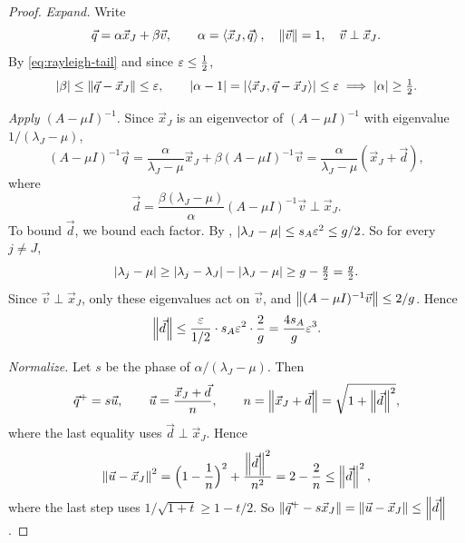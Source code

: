 \begin{proof}
  \emph{Expand.} Write
  \begin{equation*}
    \vec{q} = \alpha\vec{x}_J + \beta\vec{v}, \qquad \alpha = \left\langle \vec{x}_J, \vec{q} \right\rangle, \quad \left\lVert \vec{v} \right\rVert = 1, \quad \vec{v} \perp \vec{x}_J.
  \end{equation*}
  By \eqref{eq:rayleigh-tail} and since $\varepsilon \le \frac{1}{2}$,
  \begin{equation*}
    \left\lvert \beta \right\rvert \le \left\lVert \vec{q} - \vec{x}_J \right\rVert \le \varepsilon, \qquad
    \left\lvert \alpha - 1 \right\rvert = \left\lvert \left\langle \vec{x}_J, \vec{q} - \vec{x}_J \right\rangle \right\rvert \le \varepsilon
    \;\Longrightarrow\; \left\lvert \alpha \right\rvert \ge \tfrac{1}{2}.
  \end{equation*}

  \emph{Apply $(A - \mu I)^{-1}$.} Since $\vec{x}_J$ is an eigenvector of $(A - \mu I)^{-1}$ with eigenvalue $1/(\lambda_J - \mu)$,
  \begin{equation*}
    (A - \mu I)^{-1}\vec{q} = \frac{\alpha}{\lambda_J - \mu}\vec{x}_J + \beta(A - \mu I)^{-1}\vec{v} = \frac{\alpha}{\lambda_J - \mu}(\vec{x}_J + \vec{d}),
  \end{equation*}
  where
  \begin{equation*}
    \vec{d} = \frac{\beta(\lambda_J - \mu)}{\alpha}(A - \mu I)^{-1}\vec{v} \perp \vec{x}_J.
  \end{equation*}
  To bound $\vec{d}$, we bound each factor. By , $\left\lvert \lambda_J - \mu \right\rvert \le s_A\varepsilon^2 \le g/2$. So for every $j \ne J$,
  \begin{equation*}
    \left\lvert \lambda_j - \mu \right\rvert \ge \left\lvert \lambda_j - \lambda_J \right\rvert - \left\lvert \lambda_J - \mu \right\rvert \ge g - \tfrac{g}{2} = \tfrac{g}{2}.
  \end{equation*}
  Since $\vec{v} \perp \vec{x}_J$, only these eigenvalues act on $\vec{v}$, and $\left\lVert (A - \mu I)^{-1}\vec{v} \right\rVert \le 2/g$. Hence
  \begin{equation}
    \left\lVert \vec{d} \right\rVert \le \frac{\varepsilon}{1/2} \cdot s_A\varepsilon^2 \cdot \frac{2}{g} = \frac{4s_A}{g}\varepsilon^3.
  \end{equation}

  \emph{Normalize.} Let $s$ be the phase of $\alpha/(\lambda_J - \mu)$. Then
  \begin{equation*}
    \vec{q}^+ = s\vec{u}, \qquad \vec{u} = \frac{\vec{x}_J + \vec{d}}{n}, \qquad n = \left\lVert \vec{x}_J + \vec{d} \right\rVert = \sqrt{1 + \left\lVert \vec{d} \right\rVert^2},
  \end{equation*}
  where the last equality uses $\vec{d} \perp \vec{x}_J$. Hence
  \begin{equation*}
    \left\lVert \vec{u} - \vec{x}_J \right\rVert^2 = \Bigl(1 - \frac{1}{n}\Bigr)^2 + \frac{\left\lVert \vec{d} \right\rVert^2}{n^2} = 2 - \frac{2}{n} \le \left\lVert \vec{d} \right\rVert^2,
  \end{equation*}
  where the last step uses $1/\sqrt{1 + t} \ge 1 - t/2$. So $\left\lVert \vec{q}^+ - s\vec{x}_J \right\rVert = \left\lVert \vec{u} - \vec{x}_J \right\rVert \le \left\lVert \vec{d} \right\rVert$.
\end{proof}

